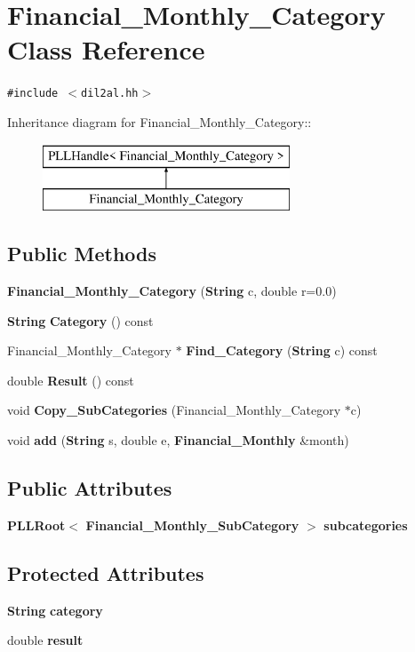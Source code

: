 \section{Financial\_\-Monthly\_\-Category  Class Reference}
\label{classFinancial__Monthly__Category}
{\tt \#include $<$dil2al.hh$>$}

Inheritance diagram for Financial\_\-Monthly\_\-Category::\begin{figure}[H]
\begin{center}
\leavevmode
\includegraphics[height=2cm]{classFinancial__Monthly__Category}
\end{center}
\end{figure}
\subsection*{Public Methods}
\begin{CompactItemize}
\item 
{\bf Financial\_\-Monthly\_\-Category} ({\bf String} c, double r=0.0)
\item 
{\bf String} {\bf Category} () const
\item 
Financial\_\-Monthly\_\-Category $\ast$ {\bf Find\_\-Category} ({\bf String} c) const
\item 
double {\bf Result} () const
\item 
void {\bf Copy\_\-Sub\-Categories} (Financial\_\-Monthly\_\-Category $\ast$c)
\item 
void {\bf add} ({\bf String} s, double e, {\bf Financial\_\-Monthly} \&month)
\end{CompactItemize}
\subsection*{Public Attributes}
\begin{CompactItemize}
\item 
{\bf PLLRoot}$<$ {\bf Financial\_\-Monthly\_\-Sub\-Category} $>$ {\bf subcategories}
\end{CompactItemize}
\subsection*{Protected Attributes}
\begin{CompactItemize}
\item 
{\bf String} {\bf category}
\item 
double {\bf result}
\end{CompactItemize}


